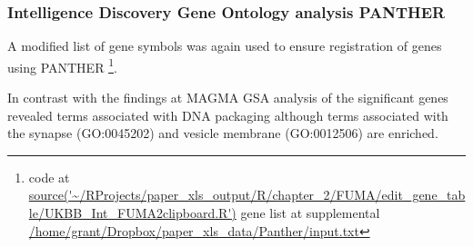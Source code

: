 








\subsubsection{Intelligence Discovery Gene Ontology analysis PANTHER}
A modified list of gene symbols was again used to ensure registration of genes using PANTHER \footnote{code at \url{source('~/RProjects/paper_xls_output/R/chapter_2/FUMA/edit_gene_table/UKBB_Int_FUMA2clipboard.R')} gene list at supplemental \url{/home/grant/Dropbox/paper_xls_data/Panther/input.txt}}.





In contrast with the findings at MAGMA GSA analysis of the significant genes revealed terms associated with DNA packaging although terms associated with the synapse (GO:0045202) and vesicle membrane (GO:0012506) are enriched.


